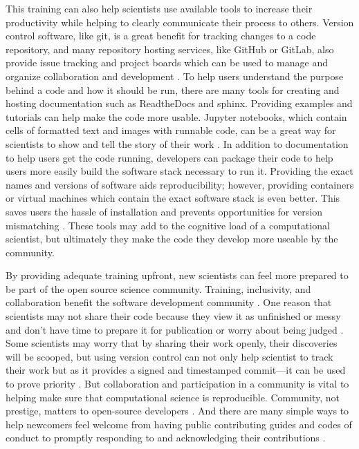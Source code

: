 This training can also help scientists use available tools to increase their productivity while helping to clearly communicate their process to others. 
Version control software, like git, is a great benefit for tracking changes to a code repository, and many repository hosting services, like GitHub or GitLab, also provide issue tracking and project boards which can be used to manage and organize collaboration and development \cite{Gentzkow2014}.
To help users understand the purpose behind a code and how it should be run, there are many tools for creating and hosting documentation such as ReadtheDocs and sphinx.
Providing examples and tutorials can help make the code more usable.
Jupyter notebooks, which contain cells of formatted text and images with runnable code, can be a great way for scientists to show and tell the story of their work \cite{Rule2019a}.
In addition to documentation to help users get the code running, developers can package their code to help users more easily build the software stack necessary to run it.
Providing the exact names and versions of software aids reproducibility; however, providing containers or virtual machines which contain the exact software stack is even better. This saves users the hassle of installation and prevents opportunities for version mismatching \cite{Cito2016, Shirts2008a}.
These tools may add to the cognitive load of a computational scientist, but ultimately they make the code they develop more useable by the community.

By providing adequate training upfront, new scientists can feel more prepared to be part of the open source science community.
Training, inclusivity, and collaboration benefit the software development community \cite{Jankowski2019}.
One reason that scientists may not share their code because they view it as unfinished or messy and don't have time to prepare it for publication or worry about being judged \cite{Irving2016}.
Some scientists may worry that by sharing their work openly, their discoveries will be scooped, but using version control can not only help scientist to track their work but as it provides a signed and timestamped commit---it can be used to prove priority \cite{Blischak2016}. 
But collaboration and participation in a community is vital to helping make sure that computational science is reproducible. 
Community, not prestige, matters to open-source developers \cite{Smirnova2022}.
And there are many simple ways to help newcomers feel welcome from having public contributing guides and codes of conduct to promptly responding to and acknowledging their contributions \cite{Sholler2019}.

